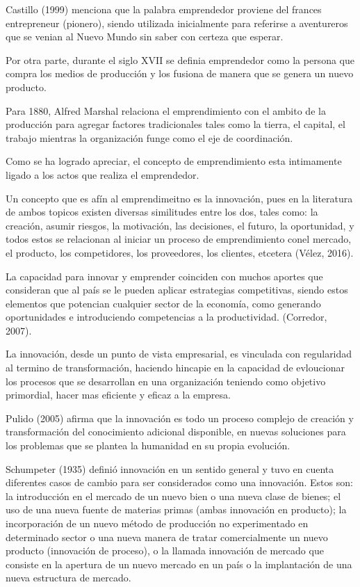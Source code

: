 \documentclass[11pt]{article}
\begin{document}
Castillo (1999) menciona que la palabra emprendedor proviene del frances entrepreneur (pionero), siendo utilizada inicialmente para referirse a aventureros que se venian al Nuevo Mundo sin saber con certeza que esperar.

Por otra parte, durante el siglo XVII se definia emprendedor como la persona que compra los medios de producción y los fusiona de manera que se genera un nuevo producto.

Para 1880, Alfred Marshal relaciona el emprendimiento con el ambito de la producción para agregar factores tradicionales tales como la tierra, el capital, el trabajo mientras la organización funge como el eje de coordinación.

Como se ha logrado apreciar, el concepto de emprendimiento esta intimamente ligado a los actos que realiza el emprendedor.

Un concepto que es afín al emprendimeitno es la innovación, pues en la literatura de ambos topicos existen diversas similitudes entre los dos, tales como: la creación,  asumir  riesgos,  la  motivación,  las  decisiones,  el  futuro,  la  oportunidad,  y  todos  estos  se relacionan al iniciar un proceso de emprendimiento conel mercado, el producto, los competidores, los proveedores, los clientes, etcetera (Vélez, 2016).

La capacidad para innovar y emprender coinciden con muchos aportes que consideran que al país se le pueden aplicar estrategias competitivas, siendo estos elementos que potencian cualquier sector de la  economía,  como  generando  oportunidades  e  introduciendo  competencias  a  la  productividad. (Corredor, 2007).

La innovación, desde un punto de vista empresarial, es vinculada con regularidad al termino de transformación, haciendo hincapie en la capacidad de evloucionar los procesos que se desarrollan en una organización teniendo como objetivo primordial, hacer mas eficiente y eficaz a la empresa.

Pulido (2005) afirma que la innovación  es  todo  un  proceso  complejo  de  creación  y  transformación  del  conocimiento  adicional  disponible,  en  nuevas  soluciones  para  los  problemas  que  se  plantea  la  humanidad  en  su  propia  evolución.

Schumpeter  (1935)  definió  innovación  en  un  sentido  general  y  tuvo  en  cuenta  diferentes  casos  de  cambio  para  ser  considerados  como  una  innovación.  Estos  son:  la  introducción  en  el  mercado  de  un  nuevo  bien  o  una  nueva  clase  de  bienes;  el  uso  de  una  nueva  fuente  de  materias  primas  (ambas  innovación  en  producto);  la  incorporación  de  un  nuevo  método  de  producción  no  experimentado    en    determinado    sector    o    una    nueva    manera    de    tratar comercialmente   un   nuevo   producto   (innovación   de   proceso),   o   la   llamada innovación  de  mercado  que  consiste  en  la  apertura  de  un  nuevo  mercado  en  un  país o la implantación de una nueva estructura de mercado.
\end{document}
